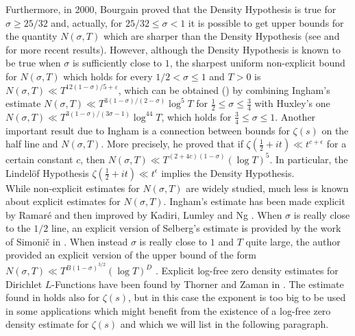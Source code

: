 \documentclass[reqno]{amsart}
\numberwithin{equation}{section}
\theoremstyle{remark}
\begin{document}
Furthermore, in 2000, Bourgain \cite{Bourgain2000OnLV} proved that the Density Hypothesis is true for $\sigma\ge 25/32$ and, actually, for $25/32\le \sigma<1$ it is possible to get upper bounds for the quantity $N(\sigma,T)$ which are sharper than the Density Hypothesis (see \cite{trudgian2023optimal} and \cite{pintz2023remark} for more recent results).    
However, although the Density Hypothesis is known to be true when $\sigma$ is sufficiently close to $1$, the sharpest uniform non-explicit bound for $N(\sigma,T)$ which holds for every $1/2<\sigma\le 1$ and $T>0$ is $N(\sigma,T)\ll T^{12(1-\sigma)/5+\varepsilon}$, which can be obtained (\cite{Ivic2003TheRZ}) by combining Ingham's estimate \cite{Ingham1940ONTE} $N(\sigma,T)\ll T^{3(1-\sigma)/(2-\sigma)}\log^ 5T $ for $\frac{1}{2}\le\sigma\le \frac{3}{4}$ with Huxley's one \cite{Huxley1971/72} $N(\sigma,T)\ll T^{3(1-\sigma)/(3\sigma-1)}\log^{44}T $, which holds for $\frac{3}{4}\le\sigma\le 1$. Another important result due to Ingham is a connection between bounds for $\zeta(s)$ on the half line and $N(\sigma,T)$. More precisely, he proved \cite{ingham1937difference} that if $\zeta\left(\frac{1}{2}+i t\right)\ll t^{c+\epsilon}$ for a certain constant $c$, then $
N(\sigma, T)\ll T^{(2+4 c)(1-\sigma)}(\log T)^5
$. In particular, the Lindelöf Hypothesis $\zeta\left(\frac{1}{2}+i t\right)\ll t^\epsilon$ implies  the Density Hypothesis.\\

While non-explicit estimates for $N(\sigma,T)$ are widely studied, much less is known about explicit estimates for $N(\sigma,T)$.  Ingham's estimate has been made explicit by Ramaré \cite{ramare2016explicit} and then improved by Kadiri, Lumley and Ng \cite{KADIRI201822}. When $\sigma$ is really close to the $1/2$ line, an explicit version of Selberg's estimate \cite{selberg1946contribution} is provided by the work of Simonič in \cite{SIMONIC2020124303}. When instead $\sigma$ is really close to $1$ and $T$ quite large, the author provided an explicit version of the upper bound of the form $ N(\sigma,T)\ll T^{B(1-\sigma)^{3/2}}(\log T)^D$ \cite{bellotti2023explicit}. Explicit log-free zero density estimates for Dirichlet $L$-Functions have been found by Thorner and Zaman in \cite{thorner2023explicit}. The estimate found in \cite{thorner2023explicit} holds also for $\zeta(s)$, but in this case the exponent is too big to be used in some applications which might benefit from the existence of a log-free zero density estimate for $\zeta(s)$ and which we will list in the following paragraph.\medskip\\
\end{document}
